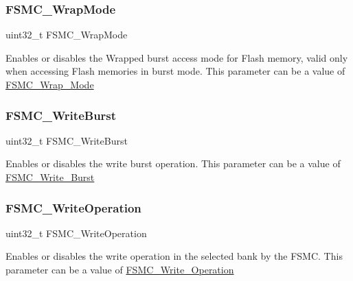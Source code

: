 \subsubsection{\texorpdfstring{FSMC\_WrapMode}{FSMC\_WrapMode}}
{\footnotesize\ttfamily uint32\+\_\+t F\+S\+M\+C\+\_\+\+Wrap\+Mode}

Enables or disables the Wrapped burst access mode for Flash memory, valid only when accessing Flash memories in burst mode. This parameter can be a value of \mbox{\hyperlink{group___f_s_m_c___wrap___mode}{F\+S\+M\+C\+\_\+\+Wrap\+\_\+\+Mode}} \mbox{\label{struct_f_s_m_c___n_o_r_s_r_a_m_init_type_def_a9f46fdb3f72340b6584d34501c19dbd4}} 
\subsubsection{\texorpdfstring{FSMC\_WriteBurst}{FSMC\_WriteBurst}}
{\footnotesize\ttfamily uint32\+\_\+t F\+S\+M\+C\+\_\+\+Write\+Burst}

Enables or disables the write burst operation. This parameter can be a value of \mbox{\hyperlink{group___f_s_m_c___write___burst}{F\+S\+M\+C\+\_\+\+Write\+\_\+\+Burst}} \mbox{\label{struct_f_s_m_c___n_o_r_s_r_a_m_init_type_def_a3a876d65250ab693595b9b840ad63676}} 
\subsubsection{\texorpdfstring{FSMC\_WriteOperation}{FSMC\_WriteOperation}}
{\footnotesize\ttfamily uint32\+\_\+t F\+S\+M\+C\+\_\+\+Write\+Operation}

Enables or disables the write operation in the selected bank by the F\+S\+MC. This parameter can be a value of \mbox{\hyperlink{group___f_s_m_c___write___operation}{F\+S\+M\+C\+\_\+\+Write\+\_\+\+Operation}} \mbox{\label{struct_f_s_m_c___n_o_r_s_r_a_m_init_type_def_a1fbd19341b882de69c3026234eff037a}} 
